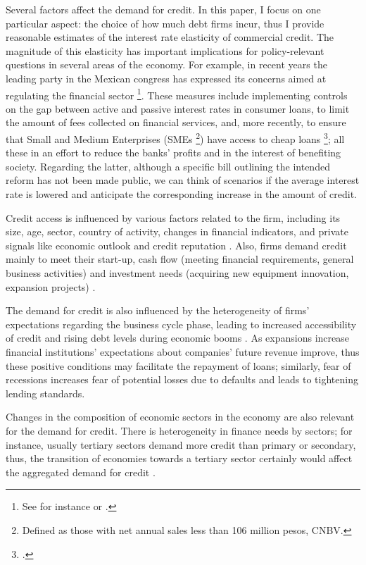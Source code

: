 \documentclass[11pt, oneside]{book}
\let\oldfootnote\footnote %
\renewcommand\footnote[1]{%
\oldfootnote{\hspace{0.05mm}#1}}
\begin{document}
Several factors affect the demand for credit. In this paper, I focus on one particular aspect: the choice of how much debt firms incur, thus I provide reasonable estimates of the interest rate elasticity of commercial credit. The magnitude of this elasticity has important implications for policy-relevant questions in several areas of the economy. For example, in recent years the leading party in the Mexican congress has expressed its concerns aimed at regulating the financial sector\footnote{See for instance  \cite{noauthor_monreal_2020} or  \cite{noauthor_ricardo_nodate}.}. These measures include implementing controls on the gap between active and passive interest rates in consumer loans, to limit the amount of fees collected on financial services, and, more recently, to ensure that Small and Medium Enterprises (SMEs\footnote{Defined as those with net annual sales less than 106 million pesos, CNBV.}) have access to cheap loans\footnote{\cite{ceo_monreal_2022}.}; all these in an effort to reduce the banks' profits and in the interest of benefiting society. Regarding the latter, although a specific bill outlining the intended reform has not been made public, we can think of scenarios if the average interest rate is lowered and anticipate the corresponding increase in the amount of credit. 

Credit access is influenced by various factors related to the firm, including its size, age, sector, country of activity, changes in financial indicators, and private signals like economic outlook and credit reputation \citep{Antonecchia2023}. Also, firms demand credit mainly to meet their  start-up, cash flow (meeting financial requirements, general business activities) and investment needs (acquiring new equipment innovation, expansion projects) \citep{OECDnewapproaches2015}. 

The demand for credit is also influenced by the heterogeneity of firms' expectations regarding the business cycle phase, leading to increased accessibility of credit and rising debt levels during economic booms \citep{NBERw20038}. As expansions increase financial institutions' expectations about companies' future revenue improve, thus these positive conditions may facilitate the repayment of loans; similarly, fear of recessions increases fear of potential losses due to defaults and leads to tightening  lending standards.

Changes in the composition of economic sectors in the economy are also relevant for the demand for credit. There is heterogeneity in finance needs by sectors; for instance, usually tertiary sectors demand more credit than primary or secondary, thus, the transition of economies towards a tertiary sector certainly would affect the aggregated demand for credit \citep{chavarin2023importance}.
\end{document}
